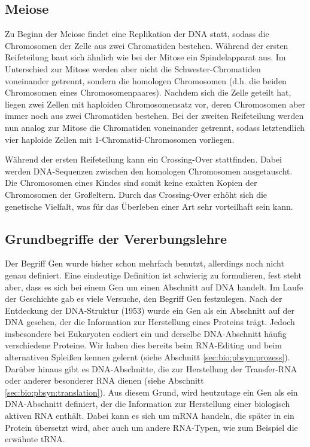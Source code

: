 \subsection{Meiose}
\label{sec:bio:erb:meiose}

Zu Beginn der Meiose findet eine Replikation der DNA statt, sodass die Chromosomen der Zelle aus zwei Chromatiden bestehen. Während der ersten Reifeteilung baut sich ähnlich wie bei der Mitose ein Spindelapparat aus. Im Unterschied zur Mitose werden aber nicht die Schwester-Chromatiden voneinander getrennt, sondern die homologen Chromosomen (d.h. die beiden Chromosomen eines Chromosomenpaares). Nachdem sich die Zelle geteilt hat, liegen zwei Zellen mit haploiden Chromosomensatz vor, deren Chromosomen aber immer noch aus zwei Chromatiden bestehen. Bei der zweiten Reifeteilung werden nun analog zur Mitose die Chromatiden voneinander getrennt, sodass letztendlich vier haploide Zellen mit 1-Chromatid-Chromosomen vorliegen.

Während der ersten Reifeteilung kann ein Crossing-Over stattfinden. Dabei werden DNA-Sequenzen zwischen den homologen Chromosomen ausgetauscht. Die Chromosomen eines Kindes sind somit keine exakten Kopien der Chromosomen der Großeltern. Durch das Crossing-Over erhöht sich die genetische Vielfalt, was für das Überleben einer Art sehr vorteilhaft sein kann.

\subsection{Grundbegriffe der Vererbungslehre}

Der Begriff Gen wurde bisher schon mehrfach benutzt, allerdings noch nicht genau definiert. Eine eindeutige Definition ist schwierig zu formulieren, fest steht aber, dass es sich bei einem Gen um einen Abschnitt auf DNA handelt. Im Laufe der Geschichte gab es viele Versuche, den Begriff Gen festzulegen. Nach der Entdeckung der DNA-Struktur (1953) wurde ein Gen als ein Abschnitt auf der DNA gesehen, der die Information zur Herstellung eines Proteins trägt. Jedoch insbesondere bei Eukaryoten codiert ein und derselbe DNA-Abschnitt häufig verschiedene Proteine. Wir haben dies bereits beim RNA-Editing und beim alternativen Spleißen kennen gelernt (siehe Abschnitt \ref{sec:bio:pbsyn:prozess}). Darüber hinaus gibt es DNA-Abschnitte, die zur Herstellung der Transfer-RNA oder anderer besonderer RNA dienen (siehe Abschnitt \ref{sec:bio:pbsyn:translation}). Aus diesem Grund, wird heutzutage ein Gen als ein DNA-Abschnitt definiert, der die Information zur Herstellung einer biologisch aktiven RNA enthält. Dabei kann es sich um mRNA handeln, die später in ein Protein übersetzt wird, aber auch um andere RNA-Typen, wie zum Beispiel die erwähnte tRNA. 

